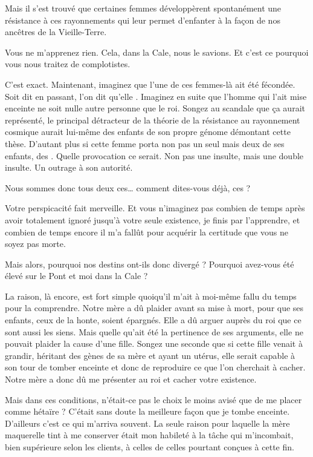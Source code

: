 \begin{drama}
   Mais il s’est trouvé que certaines femmes développèrent spontanément une résistance à ces rayonnements qui leur permet d’enfanter à la façon de nos ancêtres de la Vieille-Terre.

   \elaspeaks Vous ne m’apprenez rien. Cela, dans la Cale, nous le savions. Et c’est ce pourquoi vous nous traitez de complotistes.

   \elenaspeaks C’est exact. Maintenant, imaginez que l’une de ces femmes-là ait été fécondée. Soit dit en passant, l’on dit qu’elle . Imaginez en suite que l’homme qui l’ait mise enceinte ne soit nulle autre personne que le roi. Songez au scandale que ça aurait représenté, le principal détracteur de la théorie de la résistance au rayonnement cosmique aurait lui-même des enfants de son propre génome démontant cette thèse. D’autant plus si cette femme porta non pas un seul mais deux de ses enfants, des . Quelle provocation ce serait. Non pas une insulte, mais une double insulte. Un outrage à son autorité.

   \elaspeaks Nous sommes donc tous deux ces… comment dites-vous déjà, ces  ?

   \elenaspeaks Votre perspicacité fait merveille. Et vous n’imaginez pas combien de temps après avoir totalement ignoré jusqu’à votre seule existence, je finis par l’apprendre, et combien de temps encore il m’a fallût pour acquérir la certitude que vous ne soyez pas morte.

   \elaspeaks Mais alors, pourquoi nos destins ont-ils donc divergé ? Pourquoi avez-vous été élevé sur le Pont et moi dans la Cale ?

   \elenaspeaks La raison, là encore, est fort simple quoiqu’il m’ait à moi-même fallu du temps pour la comprendre. Notre mère a dû plaider avant sa mise à mort, pour que ses enfants, ceux de la honte, soient épargnés. Elle a dû arguer auprès du roi que ce sont aussi les siens. Mais quelle qu’ait été la pertinence de ses arguments, elle ne pouvait plaider la cause d’une fille. Songez une seconde que si cette fille venait à grandir, héritant des gènes de sa mère et ayant un utérus, elle serait capable à son tour de tomber enceinte et donc de reproduire ce que l’on cherchait à cacher. Notre mère a donc dû me présenter au roi et cacher votre existence.

   \elaspeaks Mais dans ces conditions, n’était-ce pas le choix le moins avisé que de me placer comme hétaïre ? C’était sans doute la meilleure façon que je tombe enceinte. D’ailleurs c’est ce qui m’arriva souvent. La seule raison pour laquelle la mère maquerelle tint à me conserver était mon habileté à la tâche qui m’incombait, bien supérieure selon les clients, à celles de celles pourtant conçues à cette fin.


\end{drama}
